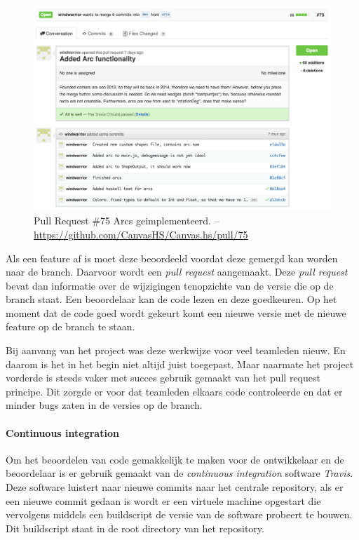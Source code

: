 \begin{figure}
\begin{center}
\includegraphics[keepaspectratio,width=\textwidth]{./images/pullrequest.png}
\caption{Pull Request \#75 Arcs geimplementeerd. – \url{https://github.com/CanvasHS/Canvas.hs/pull/75}}
\label{fig:pullrequest}
\end{center}
\end{figure}

Als een feature af is moet deze beoordeeld voordat deze gemergd kan worden naar de  branch. Daarvoor wordt een \emph{pull request} aangemaakt. Deze \emph{pull request} bevat dan informatie over de wijzigingen tenopzichte van de versie die op de  branch staat. Een beoordelaar kan de code lezen en deze goedkeuren. Op het moment dat de code goed wordt gekeurt komt een nieuwe versie met de nieuwe feature op de  branch te staan.

Bij aanvang van het project was deze werkwijze voor veel teamleden nieuw. En daarom is het in het begin niet altijd juist toegepast. Maar naarmate het project vorderde is steeds vaker met succes gebruik gemaakt van het pull request principe. Dit zorgde er voor dat teamleden elkaars code controleerde en dat er minder bugs zaten in de versies op de  branch.

\paragraph{Continuous integration} Om het beoordelen van code gemakkelijk te maken voor de ontwikkelaar en de beoordelaar is er gebruik gemaakt van de \emph{continuous integration} software \emph{Travis}. Deze software luistert naar nieuwe commits naar het centrale repository, als er een nieuwe commit gedaan is wordt er een virtuele machine opgestart die vervolgens middels een buildscript de versie van de software probeert te bouwen. Dit buildscript staat in de root directory van het repository.

